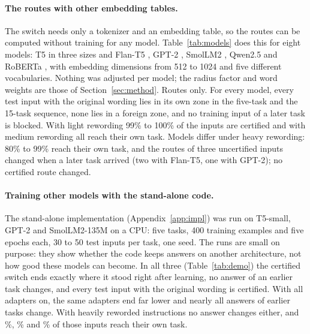 \paragraph{The routes with other embedding tables.} The switch needs only a tokenizer and an embedding table, so the routes can be computed without training for any
model. Table~\ref{tab:models} does this for eight models: T5 in three sizes \citep{raffel2020t5} and Flan-T5
\citep{chung2024flant5}, GPT-2 \citep{radford2019gpt2}, SmolLM2
\citep{allal2025smollm2}, Qwen2.5 \citep{yang2024qwen25} and RoBERTa
\citep{liu2019roberta}, with embedding dimensions from 512 to 1024 and five different
vocabularies. Nothing was adjusted per model; the radius factor and word weights are those of
Section~\ref{sec:method}. Routes only. For every model, every test input with the original wording lies in its
own zone in the five-task and the 15-task sequence, none lies in a foreign zone, and no
training input of a later task is blocked. With light rewording 99\% to 100\% of the inputs are
certified and with medium rewording all reach their own task. Models differ under heavy rewording: 80\% to 99\% reach their own task, and the routes of three uncertified inputs changed when a later task arrived (two with Flan-T5, one with GPT-2); no certified route changed.

\begin{table}[t]
  \caption{Routes computed with the embedding tables of eight models (CPU, no training). Entries
  with four numbers are for the original / light / medium / heavy wording. ``Wrong zone'': inputs
  inside the zone of another task, over both sequences and all wordings. ``Changed'': inputs
  whose route changed after their task had been added. With the original wording every input of
  the 15-task sequence is certified for every model.}
  \label{tab:models}
  \centering
  \footnotesize
  \setlength{\tabcolsep}{3pt}
  
\end{table}

\paragraph{Training other models with the stand-alone code.} The stand-alone implementation
(Appendix~\ref{app:impl}) was run on T5-small, GPT-2 and
SmolLM2-135M on a CPU: five tasks, 400 training
examples and five epochs each, 30 to 50 test inputs per task, one seed. The runs are small on purpose: they show whether the code
keeps answers on another architecture, not how good these models can become. In all three (Table~\ref{tab:demo}) the certified switch ends exactly where it stood right after learning, no
answer of an earlier task changes, and every test input with the original wording is certified. With
all adapters on, the same adapters end far lower and nearly all answers of earlier tasks change. With heavily reworded instructions no answer changes either, and
\DemoTfiveHeavyRight{}\%, \DemoGptHeavyRight{}\% and \DemoSmolHeavyRight{}\% of those inputs reach
their own task.

